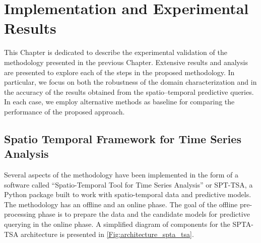 \chapter{Implementation and Experimental Results}
\label{chapter_Experimental_Results}

This Chapter is dedicated to describe the experimental validation of the methodology presented in the previous Chapter. Extensive results and analysis are presented to explore each of the steps in the proposed methodology. In particular, we focus on both the robustness of the domain characterization and in the accuracy of the results obtained from the spatio--temporal predictive queries. In each case, we employ alternative methods as baseline for comparing the performance of the proposed approach.

\section{Spatio Temporal Framework for Time Series Analysis}       
\label{Sec:SPTA-TSA}

Several aspects of the methodology have been implemented in the form of a software called ``Spatio-Temporal Tool for Time Series Analysis'' or SPT-TSA, a Python package built to work with spatio-temporal data and predictive models.  The methodology has an offline and an online phase. The goal of the offline pre-processing phase is to prepare the data and the candidate models for predictive querying in the online phase. A simplified diagram of components for the SPTA-TSA architecture is presented in \ref{Fig:architecture_spta_tsa}.

